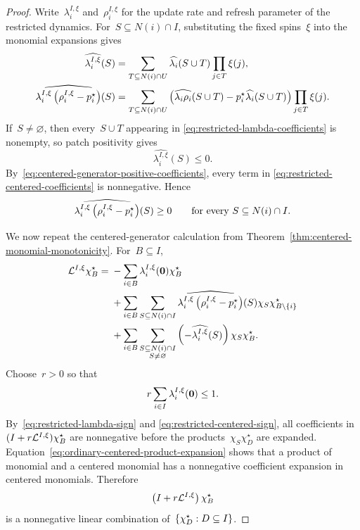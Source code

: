 \documentclass[EJP,preprint,NODS,nobera]{ejpecp}
\begin{document}
\begin{proof}
Write~$\lambda_i^{I,\xi}$ and~$\rho_i^{I,\xi}$ for the update rate and
refresh parameter of the restricted dynamics. For~$S\subseteq N(i)\cap I$,
substituting the fixed spins~$\xi$ into the monomial expansions gives
\begin{align}
\widehat{\lambda_i^{I,\xi}}(S)
&=
\sum_{T\subseteq N(i)\cap U}
\widehat{\lambda_i}(S\cup T)
\prod_{j\in T}\xi(j),
\label{eq:restricted-lambda-coefficients}
\\
\widehat{
\lambda_i^{I,\xi}
\left(\rho_i^{I,\xi}-p_i^\star\right)
}(S)
&=
\sum_{T\subseteq N(i)\cap U}
\left(
\widehat{\lambda_i\rho_i}(S\cup T)
-
p_i^\star\widehat{\lambda_i}(S\cup T)
\right)
\prod_{j\in T}\xi(j).
\label{eq:restricted-centered-coefficients}
\end{align}
If~$S\neq\varnothing$, then every~$S\cup T$ appearing in
\eqref{eq:restricted-lambda-coefficients} is nonempty, so patch positivity
gives
\begin{equation}
\label{eq:restricted-lambda-sign}
\widehat{\lambda_i^{I,\xi}}(S)\leq0.
\end{equation}
By~\eqref{eq:centered-generator-positive-coefficients}, every term in
\eqref{eq:restricted-centered-coefficients} is nonnegative. Hence
\begin{equation}
\label{eq:restricted-centered-sign}
\widehat{
\lambda_i^{I,\xi}
\left(\rho_i^{I,\xi}-p_i^\star\right)
}(S)
\geq0
\qquad
\text{for every }S\subseteq N(i)\cap I.
\end{equation}

We now repeat the centered-generator calculation from
Theorem~\ref{thm:centered-monomial-monotonicity}. For~$B\subseteq I$,
\begin{align*}
\mathcal{L}^{I,\xi}\chi_B^\star
={}&
-\sum_{i\in B}
\lambda_i^{I,\xi}(\mathbf{0})\chi_B^\star
\\
&+
\sum_{i\in B}
\sum_{S\subseteq N(i)\cap I}
\widehat{
\lambda_i^{I,\xi}
\left(\rho_i^{I,\xi}-p_i^\star\right)
}(S)
\chi_S\chi_{B\setminus\left\{i\right\}}^\star
\\
&+
\sum_{i\in B}
\sum_{\substack{S\subseteq N(i)\cap I\\S\neq\varnothing}}
\left(-\widehat{\lambda_i^{I,\xi}}(S)\right)
\chi_S\chi_B^\star.
\end{align*}
Choose~$r>0$ so that
\begin{equation*}
r\sum_{i\in I}\lambda_i^{I,\xi}(\mathbf{0})\leq1.
\end{equation*}
By~\eqref{eq:restricted-lambda-sign} and
\eqref{eq:restricted-centered-sign}, all coefficients in~$(I+r\mathcal{L}^{I,\xi})\chi_B^\star$ are nonnegative before the products~$\chi_S\chi_D^\star$ are expanded. Equation~\eqref{eq:ordinary-centered-product-expansion} shows that a product of monomial and a centered monomial has a nonnegative coefficient expansion in centered monomials. Therefore
\begin{equation*}
\left(I+r\mathcal{L}^{I,\xi}\right)\chi_B^\star
\end{equation*}
is a nonnegative linear combination of~$\left\{\chi_D^\star:D\subseteq I\right\}$.


\end{proof}
\end{document}
